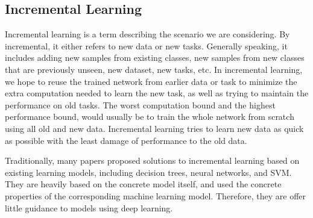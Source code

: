 \subsection{Incremental Learning}
Incremental learning is a term describing the scenario we are considering. By incremental, it either refers to new data or new tasks. Generally speaking, it includes adding new samples from existing classes, new samples from new classes that are previously unseen, new dataset, new tasks, etc. In incremental learning, we hope to reuse the trained network from earlier data or task to minimize the extra computation needed to learn the new task, as well as trying to maintain the performance on old tasks. The worst computation bound and the highest performance bound, would usually be to train the whole network from scratch using all old and new data. Incremental learning tries to learn new data as quick as possible with the least damage of performance to the old data.

Traditionally, many papers proposed solutions to incremental learning based on existing learning models, including decision trees\cite{utgoff1989incremental}, neural networks\cite{polikar2001learn++}, and SVM\cite{diehl2003svm}. They are heavily based on the concrete model itself, and used the concrete properties of the corresponding machine learning model. Therefore, they are offer little guidance to models using deep learning.

